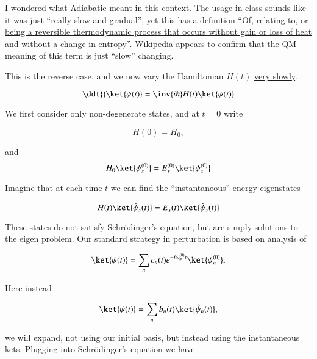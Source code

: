 I wondered what Adiabatic meant in this context.  The usage in class sounds like it was just ``really slow and gradual'', yet this has a definition ``\href{http://www.thefreedictionary.com/adiabatic}{Of, relating to, or being a reversible thermodynamic process that occurs without gain or loss of heat and without a change in entropy}''.  Wikipedia \cite{wiki:AdiabaticTheorem} appears to confirm that the QM meaning of this term is just ``slow'' changing.

This is the reverse case, and we now vary the Hamiltonian $H(t)$ \underline{very slowly}.

\begin{equation}\label{eqn:qmTwoL8:150f}
\ddt{} \ket{\psi(t)} = \inv{i \hbar} H(t) \ket{\psi(t)}
\end{equation}

We first consider only non-degenerate states, and at $t = 0$ write

\begin{equation}\label{eqn:qmTwoL8:300}
H(0) = H_0,
\end{equation}

and
\begin{equation}\label{eqn:qmTwoL8:320}
H_0 \ket{\psi_s^{(0)}} = E_s^{(0)} \ket{\psi_s^{(0)}}
\end{equation}

Imagine that at each time $t$ we can find the ``instantaneous'' energy eigenstates

\begin{equation}\label{eqn:qmTwoL8:340}
H(t) \ket{\hat{\psi}_s(t)} = E_s(t) \ket{\hat{\psi}_s(t)} 
\end{equation}

These states do not satisfy Schr\"{o}dinger's equation, but are simply solutions to the eigen problem.  Our standard strategy in perturbation is based on analysis of

\begin{equation}\label{eqn:qmTwoL8:360}
\ket{\psi(t)} = \sum_n c_n(t) e^{- i \omega_n^{(0)} t} \ket{\psi_n^{(0)} },
\end{equation}

Here instead

\begin{equation}\label{eqn:qmTwoL8:380}
\ket{\psi(t)} = 
\sum_n b_n(t) \ket{\hat{\psi}_n(t)}
,
\end{equation}

we will expand, not using our initial basis, but instead using the instantaneous kets.  Plugging into Schr\"{o}dinger's equation we have

